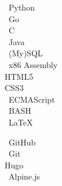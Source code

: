\documentclass{article}
\begin{document}
\begin{paracol}{2}
    \begin{tcolorbox}[title=Code]
        \faPython \ Python \\
        \faGoogle \ Go \\
        \faFileCode \ C \\
        \faJava \ Java \\
        \faDatabase \ (My)SQL \\
        \faMicrochip \ x86 Assembly \\
         HTML5 \\
         CSS3 \\
        \faJs \ ECMAScript \\
        \faTerminal \ BASH \\
        \faFilePdf \ LaTeX
    \end{tcolorbox}

    \begin{tcolorbox}[title=Tools]
        \faGithub \ GitHub \\
        \faGit \ Git \\
        \faGit* Hugo \\
        \faJs \ Alpine.js
    \end{tcolorbox}

    \vspace{20pt}

    \begin{center}
        \hypersetup{urlcolor=black}
    \end{center}
\end{paracol}
\end{document}
